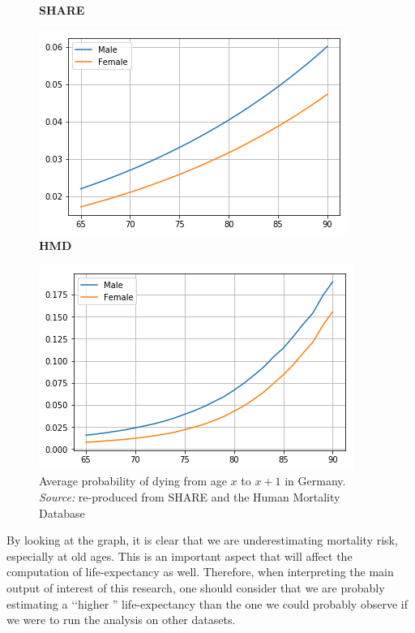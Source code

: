 \begin{figure}[H]
    \centering 
{}
\centering \textbf{SHARE}\par\medskip
  \includegraphics[width=\linewidth]{images/germany_SHARE.png}
 \endminipage\hfill
{}
\centering \textbf{HMD}\par\medskip
  \includegraphics[width=\linewidth]{images/germany.png}
\endminipage\hfill
        \captionsetup{justification=centering}
    \caption{Average probability of dying from age $x$ to $x+1$ in Germany. \\
    \textit{Source:} re-produced from SHARE and the Human Mortality Database }
    \label{fig:averages_2}
\end{figure}


By looking at the graph, it is clear that we are underestimating mortality risk, especially at old ages. This is an important aspect that will affect the computation of life-expectancy as well. Therefore, when interpreting the main output of interest of this research, one should consider that we are probably estimating a \lq\lq higher '' life-expectancy than the one we could probably observe if we were to run the analysis on other datasets.


